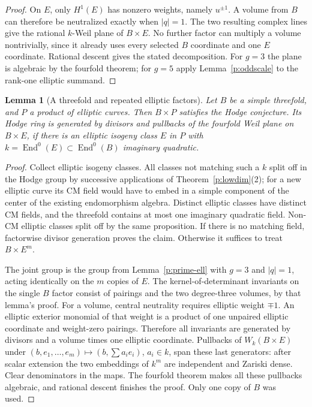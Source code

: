 \documentclass[10pt,reqno]{article}
\theoremstyle{emphasizedplain}
\theoremstyle{emphasizeddefinition}
\theoremstyle{emphasizeddefinition}
\newtheorem{prelemma}{Lemma}
\DeclareMathOperator{\End}{End}
\begin{document}
\begin{proof}
On $E$, only $H^1(E)$ has nonzero weights, namely $u^{\pm1}$.
A volume from $B$ can therefore be neutralized exactly when $|q|=1$.
The two resulting complex lines give the rational $k$-Weil plane of
$B\times E$. No further factor can multiply a volume nontrivially,
since it already uses every selected $B$ coordinate and one $E$
coordinate. Rational descent gives the stated decomposition.
For $g=3$ the plane is algebraic by the fourfold theorem; for $g=5$
apply Lemma~\ref{p:oddscale} to the rank-one elliptic summand.
\end{proof}

\begin{prelemma}[A threefold and repeated elliptic factors]
\label{p:three-ell}
Let $B$ be a simple threefold, and $P$ a product of elliptic curves.
Then $B\times P$ satisfies the Hodge conjecture. Its Hodge ring is
generated by divisors and pullbacks of the fourfold Weil plane on
$B\times E$, if there is an elliptic isogeny class $E$ in $P$ with
$k=\End^0(E)\subset\End^0(B)$ imaginary quadratic.
\end{prelemma}
\begin{proof}
Collect elliptic isogeny classes. All classes not matching such a $k$
split off in the Hodge group by successive applications of
Theorem~\ref{p:lowdim}(2); for a new elliptic curve its CM field would
have to embed in a simple component of the center of the existing
endomorphism algebra. Distinct elliptic classes have distinct CM fields,
and the threefold contains at most one imaginary quadratic field.
Non-CM elliptic classes split off by the same proposition.
If there is no matching field, factorwise divisor generation proves the
claim. Otherwise it suffices to treat $B\times E^m$.

The joint group is the group from Lemma~\ref{p:prime-ell} with $g=3$
and $|q|=1$, acting identically on the $m$ copies of $E$.
The kernel-of-determinant invariants on the single $B$ factor consist of
pairings and the two degree-three volumes, by that lemma's proof.
For a volume, central neutrality requires elliptic weight $\mp1$.
An elliptic exterior monomial of that weight is a product of one
unpaired elliptic coordinate and weight-zero pairings. Therefore all
invariants are generated by divisors and a volume times one elliptic
coordinate. Pullbacks of $W_k(B\times E)$ under
$(b,e_1,\ldots,e_m)\mapsto(b,\sum a_i e_i)$, $a_i\in k$, span these
last generators: after scalar extension the two embeddings of $k^m$
are independent and Zariski dense. Clear denominators in the maps.
The fourfold theorem makes all these pullbacks algebraic, and rational
descent finishes the proof. Only one copy of $B$ was used.
\end{proof}
\end{document}
